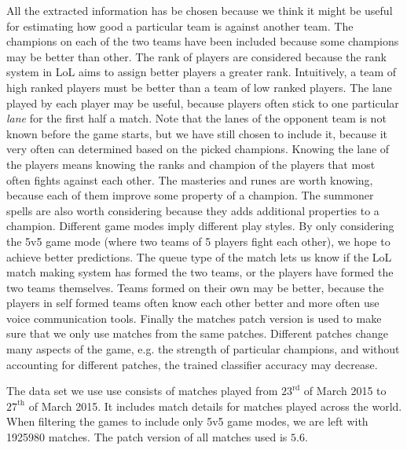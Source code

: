 All the extracted information has be chosen because we think it might be useful for estimating how good a particular team is against another team.
The champions on each of the two teams have been included because some champions may be better than other.
The rank of players are considered because the rank system in LoL aims to assign better players a greater rank.
Intuitively, a team of high ranked players must be better than a team of low ranked players.
The lane played by each player may be useful, because players often stick to one particular \textit{lane} for the first half a match.
Note that the lanes of the opponent team is not known before the game starts, but we have still chosen to include it, because it very often can determined based on the picked champions. Knowing the lane of the players means knowing the ranks and champion of the players that most often fights against each other.
The masteries and runes are worth knowing, because each of them improve some property of a champion. 
The summoner spells are also worth considering because they adds additional properties to a champion.
Different game modes imply different play styles. By only considering the 5v5 game mode (where two teams of 5 players fight each other), we hope to achieve better predictions.
The queue type of the match lets us know if the LoL match making system has formed the two teams, or the players have formed the two teams themselves.
Teams formed on their own may be better, because the players in self formed teams often know each other better and more often use voice communication tools.
Finally the matches patch version is used to make sure that we only use matches from the same patches. Different patches change many aspects of the game, e.g. the strength of particular champions, and without accounting for different patches, the trained classifier accuracy may decrease.  

The data set we use use consists of matches played from $23^{\text{rd}}$ of March 2015 to $27^{\text{th}}$ of March 2015. It includes match details for matches played across the world. When filtering the games to include only 5v5 game modes, we are left with 1925980 matches. The patch version of all matches used is $5.6$.

